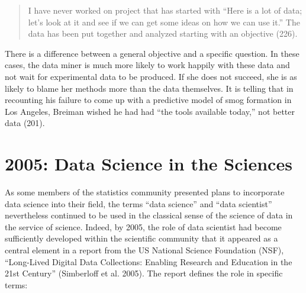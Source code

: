 \documentclass[
  letterpaper,
]{report}
\begin{document}
\begin{quote}
I have never worked on project that has started with ``Here is a lot of
data; let's look at it and see if we can get some ideas on how we can
use it.'' The data has been put together and analyzed starting with an
objective (226).
\end{quote}

There is a difference between a general objective and a specific
question. In these cases, the data miner is much more likely to work
happily with these data and not wait for experimental data to be
produced. If she does not succeed, she is as likely to blame her methods
more than the data themselves. It is telling that in recounting his
failure to come up with a predictive model of smog formation in Los
Angeles, Breiman wished he had had ``the tools available today,'' not
better data (201).

\hypertarget{data-science-in-the-sciences}{%
\section{2005: Data Science in the
Sciences}\label{data-science-in-the-sciences}}

As some members of the statistics community presented plans to
incorporate data science into their field, the terms ``data science''
and ``data scientist'' nevertheless continued to be used in the
classical sense of the science of data in the service of science.
Indeed, by 2005, the role of data scientist had become sufficiently
developed within the scientific community that it appeared as a central
element in a report from the US National Science Foundation (NSF),
``Long-Lived Digital Data Collections: Enabling Research and Education
in the 21st Century'' (Simberloff et al. 2005). The report defines the
role in specific terms:
\end{document}
